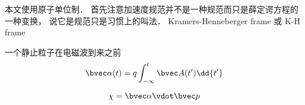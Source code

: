 

本文使用原子单位制． 首先注意加速度规范并不是一种规范而只是薛定谔方程的一种变换， 说它是规范只是习惯上的叫法． Kramers-Henneberger frame 或 K-H frame

一个静止粒子在电磁波到来之前
\begin{equation}
\bvec \alpha(t) = q\int_{-\infty}^t \bvec A(t') \dd{t'}
\end{equation}

\begin{equation}
\chi = \bvec \alpha \vdot \bvec p
\end{equation}

